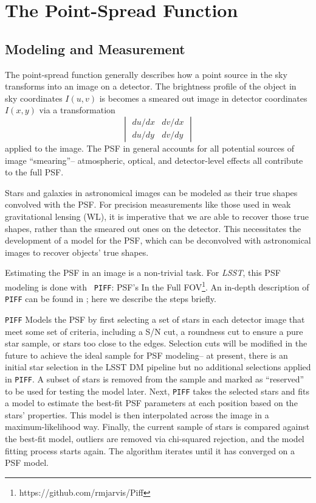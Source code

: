 \documentclass[SE,lsstdraft,authoryear,toc]{lsstdoc}
\begin{document}
\section{The Point-Spread Function} \label{sec:psf}
\subsection{Modeling and Measurement}

The point-spread function generally describes how a point source in the sky transforms into an image on a detector. The brightness profile of the object in sky coordinates $I(u,v)$ is becomes a smeared out image in detector coordinates $I(x,y)$ via a transformation
\begin{equation}
\begin{vmatrix}
    du/dx & dv/dx\\
    du/dy & dv/dy
\end{vmatrix}
\end{equation}
applied to the image. 
The PSF in general accounts for all potential sources of image ``smearing''-- atmospheric, optical, and detector-level effects all contribute to the full PSF. 

Stars and galaxies in astronomical images can be modeled as their true shapes convolved with the PSF.
For precision measurements like those used in weak gravitational lensing (WL), it is imperative that we are able to recover those true shapes, rather than the smeared out ones on the detector.
This necessitates the development of a model for the PSF, which can be deconvolved with astronomical images to recover objects' true shapes.

Estimating the PSF in an image is a non-trivial task.
For \textit{LSST}, this PSF modeling is done with \texttt{ PIFF}: PSF's In the Full FOV\footnote{https://github.com/rmjarvis/Piff}. 
An in-depth description of \texttt{PIFF} can be found in \citet{2021MNRAS.501.1282J}; here we describe the steps briefly.

\texttt{PIFF} Models the PSF by first selecting a set of stars in each detector image that meet some set of criteria, including a S/N cut, a roundness cut to ensure a pure star sample, or stars too close to the edges. 
Selection cuts will be modified in the future to achieve the ideal sample for PSF modeling-- at present, there is an initial star selection in the LSST DM pipeline but no additional selections applied in \texttt{PIFF}.
A subset of stars is removed from the sample and marked as ``reserved'' to be used for testing the model later.
Next, \texttt{PIFF} takes the selected stars and fits a model to estimate the best-fit PSF parameters at each position based on the stars' properties.
This model is then interpolated across the image in a maximum-likelihood way. Finally, the current sample of stars is compared against the best-fit model, outliers are removed via chi-squared rejection, and the model fitting process starts again.
The algorithm iterates until it has converged on a PSF model.
\end{document}
